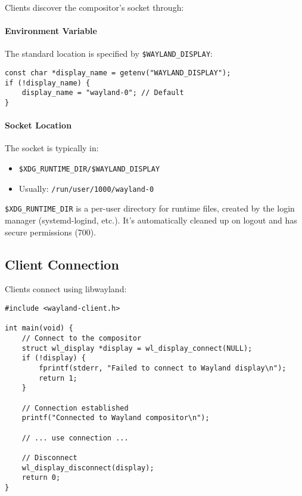 Clients discover the compositor's socket through:

\paragraph{Environment Variable}
The standard location is specified by \texttt{\$WAYLAND\_DISPLAY}:

\begin{lstlisting}[style=cstyle, caption=Finding the Display]
const char *display_name = getenv("WAYLAND_DISPLAY");
if (!display_name) {
    display_name = "wayland-0"; // Default
}
\end{lstlisting}

\paragraph{Socket Location}
The socket is typically in:
\begin{itemize}
    \item \texttt{\$XDG\_RUNTIME\_DIR/\$WAYLAND\_DISPLAY}
    \item Usually: \texttt{/run/user/1000/wayland-0}
\end{itemize}

\begin{notebox}
\texttt{\$XDG\_RUNTIME\_DIR} is a per-user directory for runtime files, created by the login manager (systemd-logind, etc.). It's automatically cleaned up on logout and has secure permissions (700).
\end{notebox}

\subsection{Client Connection}

Clients connect using libwayland:

\begin{lstlisting}[style=cstyle, caption=Connecting to Wayland]
#include <wayland-client.h>

int main(void) {
    // Connect to the compositor
    struct wl_display *display = wl_display_connect(NULL);
    if (!display) {
        fprintf(stderr, "Failed to connect to Wayland display\n");
        return 1;
    }

    // Connection established
    printf("Connected to Wayland compositor\n");

    // ... use connection ...

    // Disconnect
    wl_display_disconnect(display);
    return 0;
}
\end{lstlisting}


